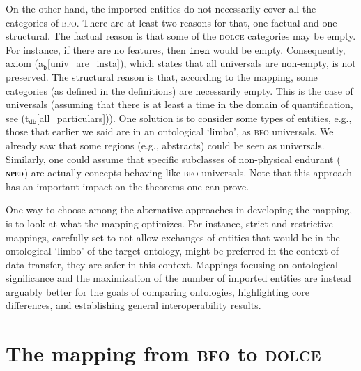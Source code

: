 \documentclass[ao]{iosart2x}
\newcommand{\nb}[1]{\textcolor{red}{$|$}\marginpar{\hspace*{-0cm}\parbox{20mm}{\scriptsize\raggedright\textcolor{red}{#1}}}}
\newcommand{\bfoAxLabel}{\textrm{a$_\texttt{b}$}}
\newcommand{\dbThrLabel}{\textrm{t$_\texttt{db}$}}
\newcommand{\refbfoax}[1]{({\bfoAxLabel}\ref{#1})}
\newcommand{\refdbth}[1]{({\dbThrLabel}\ref{#1})}
\newcommand{\cn}[1]{\mathtt{#1}}
\newcommand{\dolce}{{\textsc{dolce}}}
\newcommand{\bfo}{{\textsc{bfo}}}
\newcommand {\NPEDdcat} {\textsc{nped}}
\newcommand{\imenbcat}{\cn{imen}}
\begin{document}
On the other hand, the imported entities do not necessarily cover all the categories of {\bfo}. There are at least two reasons for that, one factual and one structural. The factual reason is that some of the {\dolce} categories may be empty. For instance, if there are no features, then $\imenbcat$ would be empty. Consequently, axiom \refbfoax{univ_are_insta}, which states that all universals are non-empty, is not preserved. The structural reason is that, according to the mapping, some categories (as defined in the definitions) are necessarily empty. 
This is the case of universals (assuming that there is at least a time in the domain of quantification, see \refdbth{all_particulars}). One solution is to consider some types of entities, e.g., those that earlier we said are in an ontological `limbo', as {\bfo} universals. We already saw that some regions (e.g., abstracts) could be seen as universals. Similarly, one could assume that specific subclasses of non-physical endurant ($\NPEDdcat$) are actually concepts behaving like {\bfo} universals. Note that this approach has an important impact on the theorems one can prove.%


One way to choose among the alternative approaches in developing the mapping, is to look at what the mapping optimizes. For instance, strict and restrictive mappings, carefully set to not allow exchanges of entities that would be in the ontological `limbo' of the target ontology, might be preferred in the context of data transfer, they are safer in this context. Mappings focusing on ontological significance and the maximization of the number of imported entities are instead arguably better for the goals of comparing ontologies, highlighting core differences, and establishing general interoperability results.

\section{The mapping from {\bfo} to {\dolce}}\label{sect_b2d}

\end{document}
